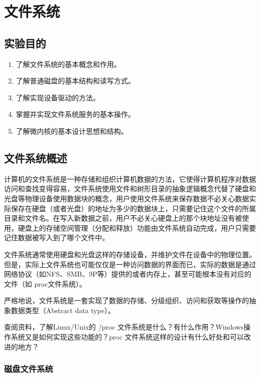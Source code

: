 \chapter{文件系统}

\section{实验目的}
  \begin{enumerate}
    \item 了解文件系统的基本概念和作用。
    \item 了解普通磁盘的基本结构和读写方式。
    \item 了解实现设备驱动的方法。
    \item 掌握并实现文件系统服务的基本操作。
    \item 了解微内核的基本设计思想和结构。
  \end{enumerate}

\section{文件系统概述}

计算机的文件系统是一种存储和组织计算机数据的方法，它使得计算机程序对数据访问和查找变得容易，文件系统使用文件和树形目录的抽象逻辑概念代替了硬盘和光盘等物理设备使用数据块的概念，用户使用文件系统来保存数据不必关心数据实际保存在硬盘（或者光盘）的地址为多少的数据块上，只需要记住这个文件的所属目录和文件名。在写入新数据之前，用户不必关心硬盘上的那个块地址没有被使用，硬盘上的存储空间管理（分配和释放）功能由文件系统自动完成，用户只需要记住数据被写入到了哪个文件中。

文件系统通常使用硬盘和光盘这样的存储设备，并维护文件在设备中的物理位置。但是，实际上文件系统也可能仅仅是一种访问数据的界面而已，实际的数据是通过网络协议（如NFS、SMB、9P等）提供的或者内存上，甚至可能根本没有对应的文件（如 proc文件系统）。

严格地说，文件系统是一套实现了数据的存储、分级组织、访问和获取等操作的抽象数据类型（Abstract data type）。

\begin{thinking}\label{think-proc}
查阅资料，了解Linux/Unix的 /proc 文件系统是什么？有什么作用？Windows操作系统又是如何实现这些功能的？proc 文件系统这样的设计有什么好处和可以改进的地方？
\end{thinking}

\subsection{磁盘文件系统}

